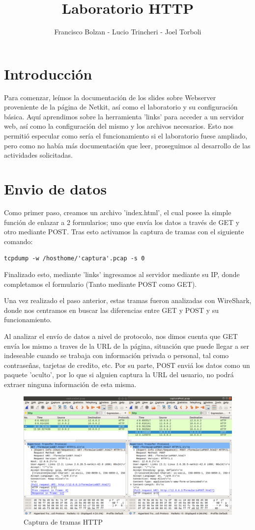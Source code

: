 \documentclass[12pt,a4paper]{article}
\title{Laboratorio HTTP}
\author{Francisco Bolzan - Lucio Trincheri - Joel Torboli}
\begin{document}
	\maketitle
	\section{Introducción}
	Para comenzar, leímos la documentación de los slides sobre Webserver proveniente de la página de Netkit, así como el laboratorio y su configuración básica. Aquí aprendimos sobre la herramienta 'links' para acceder a un servidor web, así como la configuración del mismo y los archivos necesarios. Esto nos permitió especular como sería el funcionamiento si el laboratorio fuese ampliado, pero como no había más documentación que leer, proseguimos al desarrollo de las actividades solicitadas.
	\section{Envio de datos}
	Como primer paso, creamos un archivo 'index.html', el cual posee la simple función de enlazar a 2 formularios; uno que envía los datos a través de GET y otro mediante POST.
	Tras esto activamos la captura de tramas con el siguiente comando: 
	
	\verb|tcpdump -w /hosthome/'captura'.pcap -s 0| 
	
	Finalizado esto, mediante 'links' ingresamos al servidor mediante su IP, donde completamos el formulario (Tanto mediante POST como GET).
	
	Una vez realizado el paso anterior, estas tramas fueron analizadas con WireShark, donde nos centramos en buscar las diferencias entre GET y POST y su funcionamiento.
	
	Al analizar el envío de datos a nivel de protocolo, nos dimos cuenta que GET envía los mismo a traves de la URL de la página, situación que puede llegar a ser indeseable cuando se trabaja con información privada o personal, tal como contraseñas, tarjetas de credito, etc. Por su parte, POST enviá los datos como un paquete 'oculto', por lo que si alguien captura la URL del usuario, no podrá extraer ninguna información de esta misma.
	
	\begin{figure}[H]
		\includegraphics[width=\linewidth]{getvspost.png}
		\caption{Captura de tramas HTTP}
		\label{fig:img1}
	\end{figure}
\end{document}
